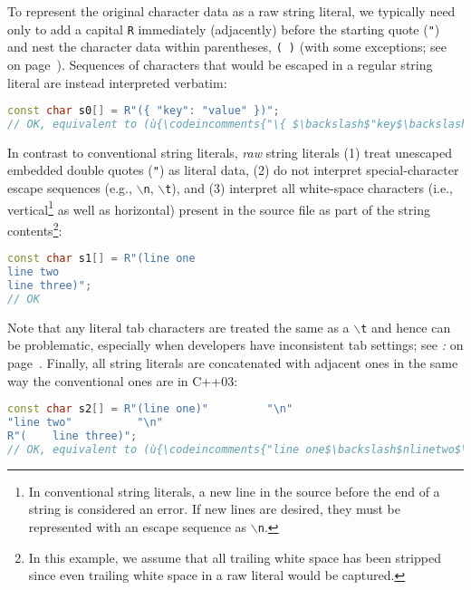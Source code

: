 \noindent To represent the original character
data as a raw string literal, we typically need only to add a capital \texttt{R} immediately
(adjacently) before the starting quote (\texttt{"}) and nest the
character data within parentheses, \texttt{(}~\texttt{)} (with some exceptions; see \textit{} on page~\pageref{collisions}). Sequences of
characters that would be escaped in a regular string literal are instead
interpreted verbatim:

\begin{lstlisting}[language=C++]
const char s0[] = R"({ "key": "value" })";
// OK, equivalent to (ù{\codeincomments{"\{ $\backslash$"key$\backslash$": $\backslash$"value$\backslash$" \}"}}ù)
\end{lstlisting}

\noindent In contrast to conventional string literals, \emph{raw} string literals
(1) treat unescaped embedded double quotes (\texttt{"}) as literal data,
(2) do not interpret special-character escape sequences (e.g.,
\texttt{$\backslash$n}, \texttt{$\backslash$t}), and (3) interpret all
white-space characters (i.e., vertical\footnote{In conventional string literals, a
new line in the source before the end of a string is considered an error.
If new lines are desired, they must be represented with an escape
sequence as \texttt{$\backslash$n}.} as well as horizontal) present in
the source file as part of the string contents{\cprotect\footnote{In
this example, we assume that all trailing white space has been stripped
since even trailing white space in a raw literal would be captured.}}:


\begin{lstlisting}[language=C++]
const char s1[] = R"(line one
line two
line three)";
// OK
\end{lstlisting}

\noindent Note that any literal tab characters are treated the same as a
\texttt{$\backslash$t} and hence can be problematic, especially when
developers have inconsistent tab settings; see \textit{: } on page~\pageref{unexpected-indentation}. Finally, all string literals are concatenated with
adjacent ones in the same way the conventional ones are in C++03:

\begin{lstlisting}[language=C++]
const char s2[] = R"(line one)"         "\n"
"line two"          "\n"
R"(    line three)";
// OK, equivalent to (ù{\codeincomments{"line one$\backslash$nlinetwo$\backslash$n~~~~line three"}}ù)
\end{lstlisting}


